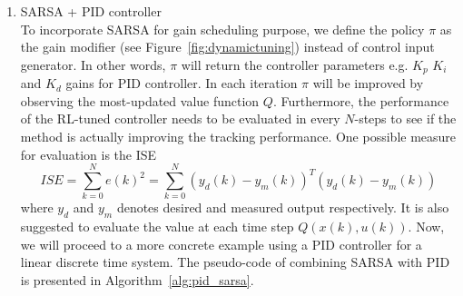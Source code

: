 \begin{enumerate}
	\item \ac{SARSA} + PID controller \\
		To incorporate \ac{SARSA} for gain scheduling purpose, we define the policy $\pi$ as the gain modifier (see Figure~\ref{fig:dynamictuning}) instead of control input generator. In other words, $\pi$ will return the controller parameters e.g. $ K_p $ $ K_i $ and $ K_d $ gains for PID controller. In each iteration $\pi$ will be improved by observing the most-updated value function $Q$. Furthermore, the performance of the \ac {RL}-tuned controller needs to be evaluated in every $ N $-steps to see if the method is actually improving the tracking performance. One possible measure for evaluation is the \ac {ISE}
		\begin{equation}
		ISE = \sum_{k=0}^{N}e(k)^2 = \sum_{k=0}^{N}(y_d(k) - y_m(k))^T(y_d(k) - y_m(k))
		\end{equation}
		where $y_d$ and $y_m$ denotes desired and measured output respectively. It is also suggested to evaluate the value at each time step $Q(x(k), u(k))$. Now, we will proceed to a more concrete example using a PID controller for a linear discrete time system. The pseudo-code of combining \ac {SARSA} with PID is presented in Algorithm~\ref{alg:pid_sarsa}.
		

\end{enumerate}
